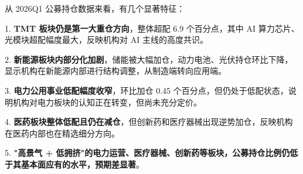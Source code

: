 \begin{keyinsight}[公募持仓结构的核心特征]
从 2026Q1 公募持仓数据来看，有几个显著特征：

\vspace{0.2em}

1. \textbf{TMT 板块仍是第一大重仓方向}，整体超配 6.9 个百分点，其中 AI 算力芯片、光模块超配幅度最大，反映机构对 AI 主线的高度共识。

2. \textbf{新能源板块内部分化加剧}，储能被大幅加仓，动力电池、光伏持仓环比下降，显示机构在新能源内部进行结构调整，从制造端转向应用端。

3. \textbf{电力公用事业低配幅度收窄}，环比加仓 0.45 个百分点，但仍处于低配状态，说明机构对电力板块的认知正在转变，但尚未充分定价。

4. \textbf{医药板块整体低配且仍在减仓}，但创新药和医疗器械出现逆势加仓，反映机构在医药内部也在精选细分方向。

5. \textbf{"高景气 + 低拥挤"的电力运营、医疗器械、创新药等板块，公募持仓比例仍低于其基本面应有的水平，预期差显著}。
\end{keyinsight}

